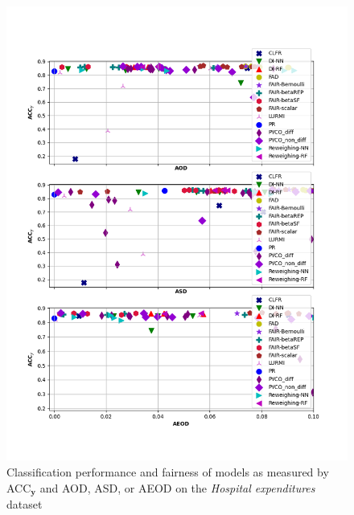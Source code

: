 \documentclass[preprint,12pt]{elsarticle}
\begin{document}
\begin{figure}
	\center
	\includegraphics[angle=0, width=1\textwidth]{MEPS19_all_ACC.png}
	\captionsetup{justification=centering}
	\caption{Classification performance and fairness of models as measured by ACC$_\mathbf{y}$ and AOD, ASD, or AEOD on the \textit{Hospital expenditures} dataset}
	\label{fig:MEPS19 all-acc}
	\vskip -0.2in
\end{figure}
\end{document}
